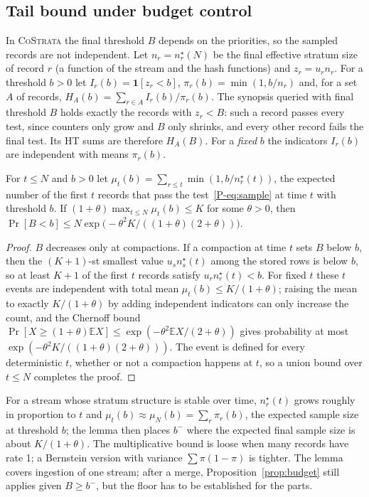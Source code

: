 \documentclass[sigconf,review,anonymous]{acmart}
\newcommand{\cs}{\textsc{CoStrata}\xspace}
\newcommand{\E}{\mathbb{E}}
\newcommand{\nstar}{n^{\star}}
\newcommand{\pref}[1]{\ref{P-#1}}
\begin{document}
\subsection{Tail bound under budget control}\label{app:budget}

In \cs the final threshold $B$ depends on the priorities, so the sampled records are not independent.
Let $n_r=\nstar_r(N)$ be the final effective stratum size of record $r$ (a function of the stream and
the hash functions) and $z_r=u_rn_r$. For a threshold $b>0$ let $I_r(b)=\mathbf 1[z_r<b]$,
$\pi_r(b)=\min(1,b/n_r)$ and, for a set $A$ of records, $H_A(b)=\sum_{r\in A}I_r(b)/\pi_r(b)$. The
synopsis queried with final threshold $B$ holds exactly the records with $z_r<B$: such a record passes
every test, since counters only grow and $B$ only shrinks, and every other record fails the final test.
Its HT sums are therefore $H_A(B)$. For a \emph{fixed} $b$ the indicators
$I_r(b)$ are independent with means $\pi_r(b)$.

\begin{lemma}\label{lem:floor}
For $t\le N$ and $b>0$ let $\mu_t(b)=\sum_{r\le t}\min(1,b/\nstar_r(t))$, the expected number of the first
$t$ records that pass the test~\pref{eq:sample} at time $t$ with threshold $b$. If
$(1+\theta)\max_{t\le N}\mu_t(b)\le K$ for some $\theta>0$, then
$\Pr[B<b]\le N\exp\bigl(-\theta^2K/((1+\theta)(2+\theta))\bigr)$.
\end{lemma}
\begin{proof}
$B$ decreases only at compactions. If a compaction at time $t$ sets $B$ below $b$, then the
$(K{+}1)$-st smallest value $u_s\nstar_s(t)$ among the stored rows is below $b$, so at least $K+1$ of the
first $t$ records satisfy $u_r\nstar_r(t)<b$. For fixed $t$ these $t$ events are independent with total
mean $\mu_t(b)\le K/(1+\theta)$; raising the mean to exactly $K/(1+\theta)$ by adding independent
indicators can only increase the count, and the Chernoff bound
$\Pr[X\ge(1+\theta)\E X]\le\exp(-\theta^2\E X/(2+\theta))$ gives probability at most
$\exp(-\theta^2K/((1+\theta)(2+\theta)))$. The event is defined for every deterministic $t$, whether or not
a compaction happens at $t$, so a union bound over $t\le N$ completes the proof.
\end{proof}

For a stream whose stratum structure is stable over time, $\nstar_r(t)$ grows roughly in proportion to
$t$ and $\mu_t(b)\approx\mu_N(b)=\sum_r\pi_r(b)$, the expected sample size at threshold $b$; the lemma then
places $b^-$ where the expected final sample size is about $K/(1+\theta)$. The multiplicative bound is
loose when many records have rate 1; a Bernstein version with variance $\sum\pi(1-\pi)$ is tighter. The
lemma covers ingestion of one stream; after a merge, Proposition~\ref{prop:budget} still applies given
$B\ge b^-$, but the floor has to be established for the parts.
\end{document}
